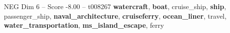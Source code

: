 \begin{textsample}{NEG Dim 6 – Score -8.00 – t008267}  \label{ex:f6_neg_020}
\textbf{watercraft}, \textbf{boat}, cruise\_ship, \textbf{ship}, passenger\_ship, \textbf{naval\_architecture}, \textbf{cruiseferry}, \textbf{ocean\_liner}, travel, \textbf{water\_transportation}, \textbf{ms\_island\_escape}, ferry

\end{textsample}
